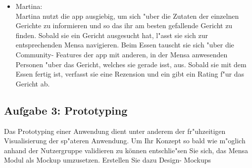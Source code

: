 \begin {enumerate}
\begin{itemize}
        \item Martina: \\
            Martina nutzt die app ausgiebig, um sich "uber die Zutaten der einzelnen Gerichte zu informieren und so das ihr am besten gefallende Gericht zu finden. 
            Sobald sie ein Gericht ausgesucht hat, l"asst sie sich zur entsprechenden Mensa navigieren.
            Beim Essen tauscht sie sich "uber die Community- Features der app mit anderen, in der Mensa anwesenden Personen "uber das Gericht, welches sie gerade isst, aus.
            Sobald sie mit dem Essen fertig ist, verfasst sie eine Rezension und ein gibt ein Rating f"ur das Gericht ab.
    \end{itemize}
\end {enumerate}

\subsection{Aufgabe 3: Prototyping  }
Das  Prototyping  einer  Anwendung  dient  unter  anderem  der  fr"uhzeitigen  Visualisierung  der sp"ateren Anwendung. 
Um Ihr Konzept so bald wie m"oglich anhand der Nutzergruppe validieren zu können entschlie"sen Sie sich, das Mensa Modul als Mockup umzusetzen.  
Erstellen  Sie  dazu  Design- Mockups  
